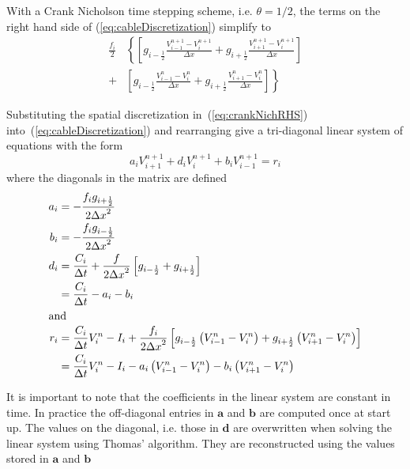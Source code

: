 \documentclass[11pt,a4paper]{article}
\newcommand{\eq}[1]{(\ref{#1})} %
\newcommand{\dx}{{\Delta x}} %
\newcommand{\dt}{{\Delta t}} %
\newcommand{\at}[1]{{#1}_{i}} %
\newcommand{\atplus}[1]{{#1}_{i+1}} %
\newcommand{\atminus}[1]{{#1}_{i-1}} %
\newcommand{\atplushalf}[1]{{#1}_{i+\frac{1}{2}}} %
\newcommand{\atminushalf}[1]{{#1}_{i-\frac{1}{2}}} %
\newcommand{\vv}[1]{\mathbf{#1}}
\begin{document}
With a Crank Nicholson time stepping scheme, i.e. $\theta=1/2$, the terms on the right hand side of \eq{eq:cableDiscretization} simplify to
\begin{align}
        \frac{\at{f}}{2}
        &\left\{
            \left[
                \atminushalf{g} \frac{\atminus{V}^{n+1}-\at{V}^{n+1}}{\dx}
              + \atplushalf{g}  \frac{\atplus{V}^{n+1}-\at{V}^{n+1}}{\dx}
            \right]
        \right. \nonumber \\
        +
        &\left.
            \left[
                \atminushalf{g} \frac{\atminus{V}^{n}-\at{V}^{n}}{\dx}
              + \atplushalf{g}  \frac{\atplus{V}^{n}-\at{V}^{n}}{\dx}
            \right]
        \right\} \label{eq:crankNichRHS}
\end{align}

Substituting the spatial discretization in~\eq{eq:crankNichRHS} into~\eq{eq:cableDiscretization} and rearranging give a tri-diagonal linear system of equations with the form
\begin{equation}
    \at{a} \atplus{V}^{n+1} + \at{d} \at{V}^{n+1} + \at{b} \atminus{V}^{n+1} = \at{r}
\end{equation}
where the diagonals in the matrix are defined
\begin{align}
    \at{a}  &=  -\frac{\at{f}\atplushalf{g}}{2\dx^2} \\
    \at{b}  &=  -\frac{\at{f}\atminushalf{g}}{2\dx^2} \\
    \at{d}  &=  \frac{\at{C}}{\dt} + \frac{f}{2\dx^2}\left[\atminushalf{g}+\atplushalf{g}\right] \nonumber\\
            &=  \frac{\at{C}}{\dt} - \at{a} - \at{b} \\
\intertext{and}
    \at{r}  &=  \frac{\at{C}}{\dt} \at{V}^n - \at{I} + \frac{\at{f}}{2\dx^2}
                    \left[
                        \atminushalf{g} \left( \atminus{V}^{n} - \at{V}^{n} \right)
                        +
                        \atplushalf{g}  \left( \atplus{V}^{n}  - \at{V}^{n} \right)
                    \right] \nonumber\\
            &=  \frac{\at{C}}{\dt} \at{V}^n
                - \at{I}
                - \at{a} \left( \atminus{V}^{n} - \at{V}^{n} \right)
                - \at{b} \left( \atplus{V}^{n}  - \at{V}^{n} \right)
\end{align}

It is important to note that the coefficients in the linear system are constant in time. In practice the off-diagonal entries in $\vv{a}$ and $\vv{b}$ are computed once at start up. The values on the diagonal, i.e. those in $\vv{d}$ are overwritten when solving the linear system using Thomas' algorithm. They are reconstructed using the values stored in $\vv{a}$ and $\vv{b}$
\end{document}
